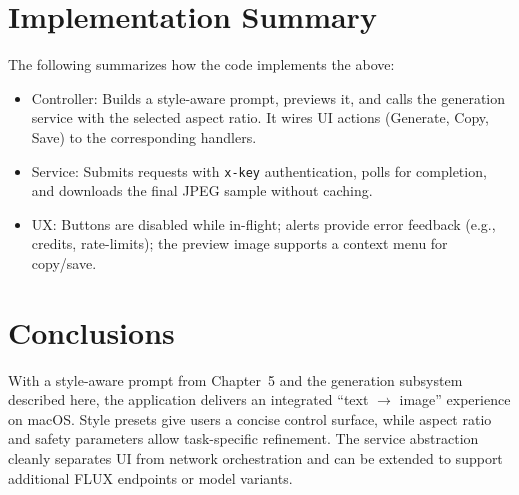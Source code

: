\section{Implementation Summary}
The following summarizes how the code implements the above:
\begin{itemize}
  \item Controller: Builds a style-aware prompt, previews it, and calls the generation service with the selected aspect ratio. It wires UI actions (Generate, Copy, Save) to the corresponding handlers.
  \item Service: Submits requests with \texttt{x-key} authentication, polls for completion, and downloads the final JPEG sample without caching.
  \item UX: Buttons are disabled while in-flight; alerts provide error feedback (e.g., credits, rate-limits); the preview image supports a context menu for copy/save.
\end{itemize}

\section{Conclusions}
With a style-aware prompt from Chapter~5 and the generation subsystem described here, the application delivers an integrated ``text $\rightarrow$ image'' experience on macOS. Style presets give users a concise control surface, while aspect ratio and safety parameters allow task-specific refinement. The service abstraction cleanly separates UI from network orchestration and can be extended to support additional FLUX endpoints or model variants.

